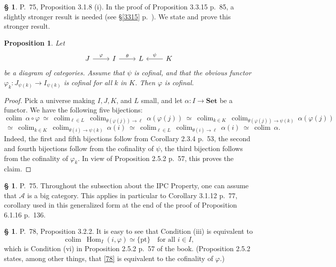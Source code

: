 \documentclass[12pt]{article}
\newtheorem{prop}[thm]{Proposition}
\theoremstyle{remark}
\theoremstyle{definition}
\newtheorem{s}[thm]{\S}
\newcommand{\A}{\mathcal A}
\newcommand{\pt}{\{\text{pt}\}}
\newcommand{\Set}{\mathbf{Set}}
\DeclareMathOperator*{\coli}{colim}
\DeclareMathOperator*{\co}{colim}
\DeclareMathOperator{\Hom}{Hom}%
\begin{document}
\begin{s} 
P.~75, Proposition 3.1.8 (i). In the proof of Proposition 3.3.15 p.~85, a slightly stronger result is needed (see \S\ref{3315} p.~\pageref{3315}). We state and prove this stronger result. 
%
\begin{prop}\label{318i} 
%
Let 
$$
\begin{tikzcd}
J\ar{r}{\varphi}&I\ar{r}{\theta}&L&K\ar{l}[swap]{\psi}
\end{tikzcd}
$$
be a diagram of categories. Assume that $\psi$ is cofinal, and that the obvious functor $\varphi_k:J_{\psi(k)}\to I_{\psi(k)}$ is cofinal for all $k$ in $K$. Then $\varphi$ is cofinal. 
%
\end{prop} 
%
\begin{proof}
Pick a universe making $I,J,K$, and $L$ small, and let $\alpha:I\to\Set$ be a functor. We have the following five bijections:
$$
\coli\ \alpha\circ\varphi\ \simeq\ 
%
\coli_{\ell\in L}\ \coli_{\theta(\varphi(j))\to\ell}\ \alpha(\varphi(j))\ \simeq\ 
%
\coli_{k\in K}\ \coli_{\theta(\varphi(j))\to\psi(k)}\ \alpha(\varphi(j))
$$
$$
\ \simeq\ \coli_{k\in K}\ \coli_{\theta(i)\to\psi(k)}\ \alpha(i)\ \simeq\ 
%
\coli_{\ell\in L}\ \coli_{\theta(i)\to\ell}\ \alpha(i)\ \simeq\ 
%
\coli\ \alpha.
$$
Indeed, the first and fifth bijections follow from Corollary 2.3.4 p.~53, the second and fourth bijections follow from the cofinality of $\psi$, the third bijection follows from the cofinality of $\varphi_k$. In view of Proposition 2.5.2 p.~57, this proves the claim.
\end{proof}
\end{s}
%
%
\begin{s}\label{cipc}
P.~75. Throughout the subsection about the IPC Property, one can assume that $\A$ is a big category. This applies in particular to Corollary 3.1.12 p.~77, corollary used in this generalized form at the end of the proof of Proposition 6.1.16 p.~136.
\end{s}
%
%
\begin{s} 
P.~78, Proposition 3.2.2. It is easy to see that Condition (iii) is equivalent to
%
\begin{equation}\label{78} 
\co\ \Hom_I(i,\varphi)\simeq\pt\quad\text{for all }i\in I, 
\end{equation} 
%
which is Condition (vi) in Proposition 2.5.2 p.~57 of the book. (Proposition 2.5.2 states, among other things, that \eqref{78} is equivalent to the cofinality of $\varphi$.)
\end{s}
%
%
\end{document}

